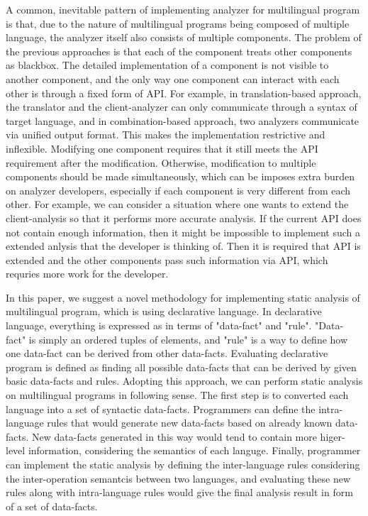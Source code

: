 A common, inevitable pattern of implementing analyzer for multilingual program
is that, due to the nature of multilingual programs being composed of multiple
language, the analyzer itself also consists of multiple components. The problem
of the previous approaches is that each of the component treats other
components as blackbox. The detailed implementation of a component is not
visible to another component, and the only way one component can interact with
each other is through a fixed form of API. For example, in translation-based
approach, the translator and the client-analyzer can only communicate through a
syntax of target language, and in combination-based approach, two analyzers
communicate via unified output format. This makes the implementation
restrictive and inflexible. Modifying one component requires that it still
meets the API requirement after the modification. Otherwise, modification to
multiple components should be made simultaneously, which can be imposes extra
burden on analyzer developers, especially if each component is very different
from each other. For example, we can consider a situation where one wants to
extend the client-analysis so that it performs more accurate analysis. If the
current API does not contain enough information, then it might be impossible to
implement such a extended anlysis that the developer is thinking of. Then it is
required that API is extended and the other components pass such information
via API, which requries more work for the developer.

In this paper, we suggest a novel methodology for implementing static analysis
of multilingual program, which is using declarative language.  In declarative
language, everything is expressed as in terms of "data-fact" and "rule".
"Data-fact" is simply an ordered tuples of elements, and "rule" is a way to
define how one data-fact can be derived from other data-facts. Evaluating
declarative program is defined as finding all possible data-facts that can be
derived by given basic data-facts and rules.  Adopting this approach, we can
perform static analysis on multilingual programs in following sense.  The first
step is to converted each language into a set of syntactic data-facts.
Programmers can define the intra-language rules that would generate new
data-facts based on already known data-facts. New data-facts generated in this
way would tend to contain more higer-level information, considering the
semantics of each languge. Finally, programmer can implement the static
analysis by defining the inter-language rules considering the inter-operation
semantcis between two languages, and evaluating these new rules along with
intra-language rules would give the final analysis result in form of a set of
data-facts.

